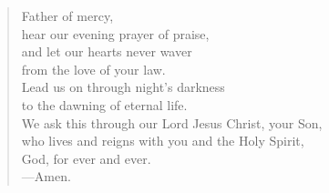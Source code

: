 \prayer

\setlength{\leftmargini}{\prayerleftmargini}

\begin{verse}
Father of mercy,\\
hear our evening prayer of praise,\\
and let our hearts never waver\\
from the love of your law.\\
Lead us on through night’s darkness\\
to the dawning of eternal life.\\
We ask this through our Lord Jesus Christ, your Son,\\
who lives and reigns with you and the Holy Spirit,\\
God, for ever and ever.\\
{\color{red}---\thinspace}Amen.
\end{verse}

\setlength{\leftmargini}{\defleftmargini}